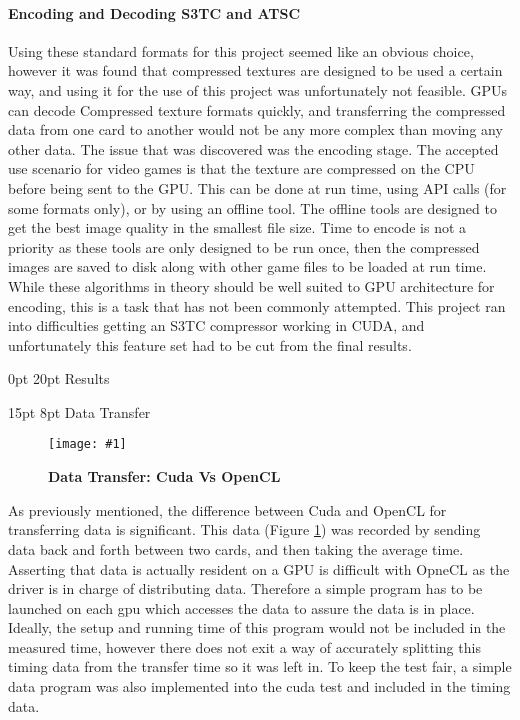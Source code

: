 \documentclass[12pt,a4paper]{article}
\makeatletter
\newcommand{\figuremacroWHN}[3]{
	\begin{figure}[h!] %
		\centering
		\texttt{[image: \#1]}
		\caption[#2]{\textbf{#2}}
		\label{fig:#1}
	\end{figure}
}
\renewcommand\subsection{\@startsection {subsection}{1}{2mm} %
                               {15pt} %
                               {8pt} %
                               {\fontsize{13pt}{1em}\bfseries}}
\renewcommand\section{\@startsection {section}{1}{0mm} %
                               {0pt} %
                               {20pt} %
                               {\fontsize{14pt}{1em}\bfseries\newpage}}
\makeatother
\begin{document}
\paragraph{Encoding and Decoding S3TC and ATSC}
Using these standard formats for this project seemed like an obvious choice, however it was found that compressed textures are designed to be used a certain way, and using it for the use of this project was unfortunately not feasible.
GPUs can decode Compressed texture formats quickly, and transferring the compressed data from one card to another would not be any more complex than moving any other data. The issue that was discovered was the encoding stage. The accepted use scenario for video games is that the texture are compressed on the CPU before being sent to the GPU. This can be done at run time, using API calls (for some formats only), or by using an offline tool. The offline tools are designed to get the best image quality in the smallest file size. Time to encode is not a priority as these tools are only designed to be run once, then the compressed images are saved to disk along with other game files to be loaded at run time.
While these algorithms in theory should be well suited to GPU architecture for encoding, this is a task that has not been commonly attempted. This project ran into difficulties getting an S3TC compressor working in CUDA, and  unfortunately this feature set had to be cut from the final results. 

\section{Results}

\subsection{Data Transfer}

\figuremacroWHN
{DataTransferCudaUVAVSOpenCL}
{Data Transfer: Cuda Vs OpenCL}
{1.0}

As previously mentioned, the difference between Cuda and OpenCL for transferring data is significant. This data (Figure \ref{fig:DataTransferCudaUVAVSOpenCL}) was recorded by sending data back and forth between two cards, and then taking the average time. 
Asserting that data is actually resident on a GPU is difficult with OpneCL as the driver is in charge of distributing data. 
Therefore a simple program has to be launched on each gpu which accesses the data to assure the data is in place.
Ideally, the setup and running time of this program would not be included in the measured time, however there does not exit a way of accurately splitting this timing data from the transfer time so it was left in. 
To keep the test fair, a simple data program was also implemented into the cuda test and included in the timing data.
\end{document}
